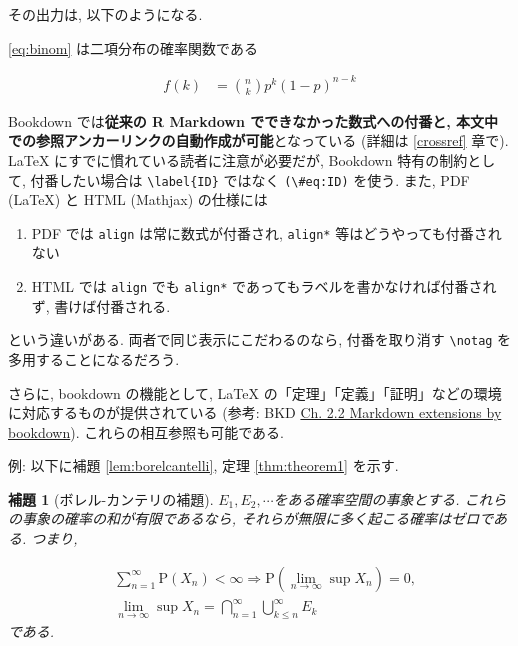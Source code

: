 \documentclass[
  xelatex,ja=standard,jafont=noto]{bxjsbook}
\providecommand{\tightlist}{%
  \setlength{\itemsep}{0pt}\setlength{\parskip}{0pt}}
\newtheorem{lemma}{補題}[chapter]
\theoremstyle{definition}
\theoremstyle{definition}
\theoremstyle{definition}
\theoremstyle{definition}
\theoremstyle{remark}
\begin{document}
その出力は, 以下のようになる.

\eqref{eq:binom} は二項分布の確率関数である

\begin{align}
f(k) &= {n \choose k} p^{k} (1-p)^{n-k} \label{eq:binom}
\end{align}

Bookdown では\textbf{従来の R Markdown でできなかった数式への付番と,
本文中での参照アンカーリンクの自動作成が可能}となっている (詳細は
\ref{crossref} 章で). LaTeX にすでに慣れている読者に注意が必要だが,
Bookdown 特有の制約として, 付番したい場合は
\texttt{\textbackslash{}label\{ID\}} ではなく
\texttt{(\textbackslash{}\#eq:ID)} を使う. また, PDF (LaTeX) と HTML
(Mathjax) の仕様には

\begin{enumerate}
\def\labelenumi{\arabic{enumi}.}
\tightlist
\item
  PDF では \texttt{align} は常に数式が付番され, \texttt{align*}
  等はどうやっても付番されない
\item
  HTML では \texttt{align} でも \texttt{align*}
  であってもラベルを書かなければ付番されず, 書けば付番される.
\end{enumerate}

という違いがある. 両者で同じ表示にこだわるのなら, 付番を取り消す
\texttt{\textbackslash{}notag} を多用することになるだろう.

さらに, bookdown の機能として, LaTeX
の「定理」「定義」「証明」などの環境に対応するものが提供されている
(参考: BKD
\href{https://bookdown.org/yihui/bookdown/markdown-extensions-by-bookdown.html}{Ch.
2.2 Markdown extensions by bookdown}). これらの相互参照も可能である.

例: 以下に補題 \ref{lem:borelcantelli}, 定理 \ref{thm:theorem1} を示す.

\begin{lemma}[ボレル-カンテリの補題]
\protect\hypertarget{lem:borelcantelli}{}{\label{lem:borelcantelli}
{}
}\({E_1,E_2,\cdots}\)をある確率空間の事象とする.
これらの事象の確率の和が有限であるなら,
それらが無限に多く起こる確率はゼロである. つまり,

\begin{align*}
& \sum_{n=1}^\infty \mathrm{P}(X_n) <\infty \Rightarrow \mathrm{P}\left(\lim_{n\to\infty}\sup X_n\right) = 0,\\
& \lim_{n\to\infty}\sup X_n = \bigcap_{n=1}^\infty\bigcup_{k\leq n}^\infty E_k
\end{align*}
である. \end{lemma}
\end{document}
